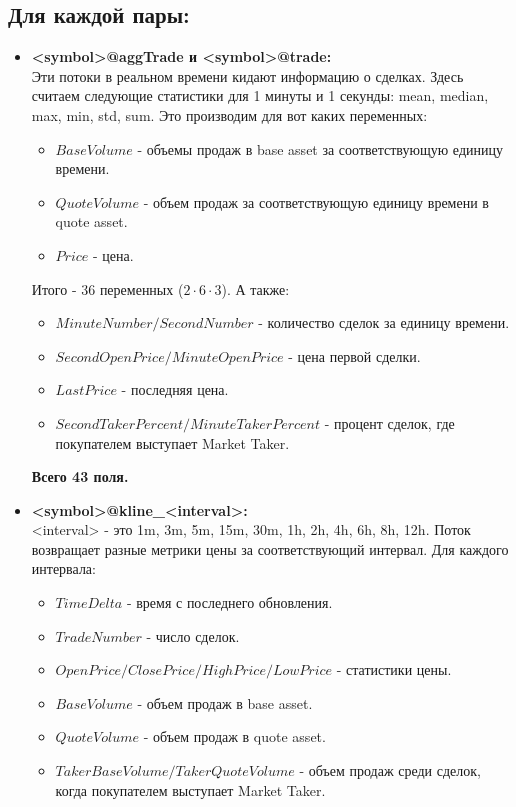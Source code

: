 \documentclass[a4paper,12pt]{article}
\begin{document}
\subsection*{Для каждой пары:}
\begin{itemize}
	\item \textbf{<symbol>@aggTrade и <symbol>@trade:} \\
	Эти потоки в реальном времени кидают информацию о сделках. Здесь считаем следующие статистики для 1 минуты и 1 секунды: mean, median, max, min, std, sum. Это производим для вот каких переменных:
	\begin{itemize}
		\item $BaseVolume$ - объемы продаж в base asset за соответствующую единицу времени.
		\item $QuoteVolume$ - объем продаж за соответствующую единицу времени в quote asset.
		\item $Price$ - цена.
	\end{itemize}
	Итого - 36 переменных ($2 \cdot 6 \cdot 3$).
	А также:
	\begin{itemize}
		\item $MinuteNumber/SecondNumber$ - количество сделок за единицу времени.
		\item $SecondOpenPrice/MinuteOpenPrice$ - цена первой сделки.
		\item $LastPrice$ - последняя цена.
		\item $SecondTakerPercent/MinuteTakerPercent$ - процент сделок, где покупателем выступает Market Taker.
	\end{itemize}
	\textbf{Всего 43 поля.}
	\item \textbf{<symbol>@kline\_<interval>:} \\
	<interval> - это 1m, 3m, 5m, 15m, 30m, 1h, 2h, 4h, 6h, 8h, 12h. Поток возвращает разные метрики цены за соответствующий интервал. Для каждого интервала:
	\begin{itemize}
		\item $TimeDelta$ - время с последнего обновления.
		\item $TradeNumber$ - число сделок.
		\item $OpenPrice/ClosePrice/HighPrice/LowPrice$ - статистики цены.
		\item $BaseVolume$ - объем продаж в base asset.
		\item $QuoteVolume$ - объем продаж в quote asset.
		\item $TakerBaseVolume/TakerQuoteVolume$ - объем продаж среди сделок, когда покупателем выступает Market Taker.
	\end{itemize}

\end{itemize}
\end{document}
